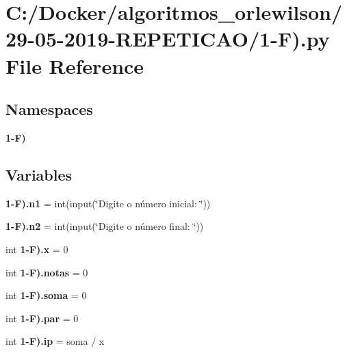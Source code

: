 \section{C\+:/\+Docker/algoritmos\+\_\+orlewilson/29-\/05-\/2019-\/\+R\+E\+P\+E\+T\+I\+C\+A\+O/1-\/F).py File Reference}
\label{1-_f_08_8py}
\subsection*{Namespaces}
\begin{DoxyCompactItemize}
\item 
 \textbf{ 1-\/\+F)}
\end{DoxyCompactItemize}
\subsection*{Variables}
\begin{DoxyCompactItemize}
\item 
\textbf{ 1-\/\+F).\+n1} = int(input(\char`\"{}Digite o número inicial\+: \char`\"{}))
\item 
\textbf{ 1-\/\+F).\+n2} = int(input(\char`\"{}Digite o número final\+: \char`\"{}))
\item 
int \textbf{ 1-\/\+F).\+x} = 0
\item 
int \textbf{ 1-\/\+F).\+notas} = 0
\item 
int \textbf{ 1-\/\+F).\+soma} = 0
\item 
int \textbf{ 1-\/\+F).\+par} = 0
\item 
int \textbf{ 1-\/\+F).\+ip} = soma / x
\end{DoxyCompactItemize}
